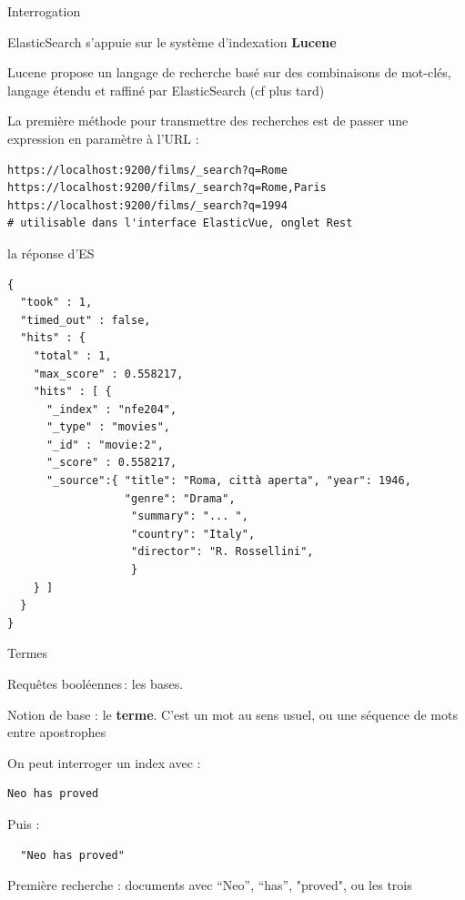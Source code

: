
\begin{frame}[fragile]{Interrogation}
  \begin{redbullet}
    \item ElasticSearch s’appuie sur le système d’indexation \textbf{Lucene}

\item Lucene propose un langage de recherche basé sur des combinaisons de
  mot-clés, langage étendu et raffiné par ElasticSearch (cf plus tard)
\item La première méthode pour transmettre des recherches est de passer une
  expression en paramètre à l’URL :
\begin{verbatim}
https://localhost:9200/films/_search?q=Rome
https://localhost:9200/films/_search?q=Rome,Paris
https://localhost:9200/films/_search?q=1994
# utilisable dans l'interface ElasticVue, onglet Rest
\end{verbatim}

\end{redbullet}
\end{frame}

\begin{frame}[fragile]{la réponse d'ES}
	\begin{verbatim}
{
  "took" : 1,
  "timed_out" : false,
  "hits" : {
    "total" : 1,
    "max_score" : 0.558217,
    "hits" : [ {
      "_index" : "nfe204",
      "_type" : "movies",
      "_id" : "movie:2",
      "_score" : 0.558217,
      "_source":{ "title": "Roma, città aperta", "year": 1946, 
                  "genre": "Drama",
                   "summary": "... ", 
                   "country": "Italy", 
                   "director": "R. Rossellini", 
				   }
    } ]
  }
}

\end{verbatim} 
\end{frame} 


\begin{frame}[fragile]{Termes}

Requêtes booléennes\,: les bases.

  \begin{redbullet}
    \item Notion de base : le {\bf terme}.  C'est un mot au sens usuel, 
         ou une séquence de mots entre apostrophes
  \end{redbullet}
\smallskip
On peut interroger un index avec :
\begin{verbatim}
Neo has proved
\end{verbatim}
Puis :
\begin{verbatim}
  "Neo has proved"
\end{verbatim}
\vfill
\begin{blocgauche}
  Première recherche : documents avec ``Neo'', ``has'', "proved", ou les trois
\end{blocgauche}

\end{frame}

